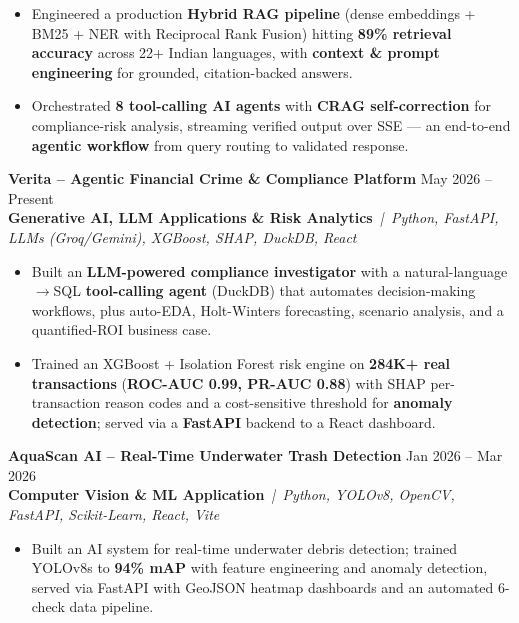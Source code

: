 \documentclass[a4paper,10pt]{article}
\newcommand{\projectEntry}[4]{%
  \vspace{1pt}%
  \noindent\textbf{\color{HeaderDark}#1} \hfill {\small\color{SubText}#2}\\[-4pt]%
  {\scriptsize\color{AccentTeal}\textbf{#3}} {\scriptsize\color{TechTag}\textit{\,|\, #4}}%
  \vspace{0pt}\par%
}
\begin{document}
\begin{itemize}[leftmargin=14pt, itemsep=0pt, parsep=0pt, topsep=1pt, label={\color{BulletColor}\textbf{--}}]
  \item {\small Engineered a production \textbf{Hybrid RAG pipeline} (dense embeddings + BM25 + NER with Reciprocal Rank Fusion) hitting \textbf{89\% retrieval accuracy} across 22+ Indian languages, with \textbf{context \& prompt engineering} for grounded, citation-backed answers.}
  \item {\small Orchestrated \textbf{8 tool-calling AI agents} with \textbf{CRAG self-correction} for compliance-risk analysis, streaming verified output over SSE --- an end-to-end \textbf{agentic workflow} from query routing to validated response.}
\end{itemize}

\vspace{1pt}

\projectEntry{Verita -- Agentic Financial Crime \& Compliance Platform}
  {May 2026 -- Present}
  {Generative AI, LLM Applications \& Risk Analytics}
  {Python, FastAPI, LLMs (Groq/Gemini), XGBoost, SHAP, DuckDB, React}

\begin{itemize}[leftmargin=14pt, itemsep=0pt, parsep=0pt, topsep=1pt, label={\color{BulletColor}\textbf{--}}]
  \item {\small Built an \textbf{LLM-powered compliance investigator} with a natural-language$\rightarrow$SQL \textbf{tool-calling agent} (DuckDB) that automates decision-making workflows, plus auto-EDA, Holt-Winters forecasting, scenario analysis, and a quantified-ROI business case.}
  \item {\small Trained an XGBoost + Isolation Forest risk engine on \textbf{284K+ real transactions} (\textbf{ROC-AUC 0.99, PR-AUC 0.88}) with SHAP per-transaction reason codes and a cost-sensitive threshold for \textbf{anomaly detection}; served via a \textbf{FastAPI} backend to a React dashboard.}
\end{itemize}

\vspace{1pt}

\projectEntry{AquaScan AI -- Real-Time Underwater Trash Detection}
  {Jan 2026 -- Mar 2026}
  {Computer Vision \& ML Application}
  {Python, YOLOv8, OpenCV, FastAPI, Scikit-Learn, React, Vite}

\begin{itemize}[leftmargin=14pt, itemsep=0pt, parsep=0pt, topsep=1pt, label={\color{BulletColor}\textbf{--}}]
  \item {\small Built an AI system for real-time underwater debris detection; trained YOLOv8s to \textbf{94\% mAP} with feature engineering and anomaly detection, served via FastAPI with GeoJSON heatmap dashboards and an automated 6-check data pipeline.}
\end{itemize}
\end{document}

